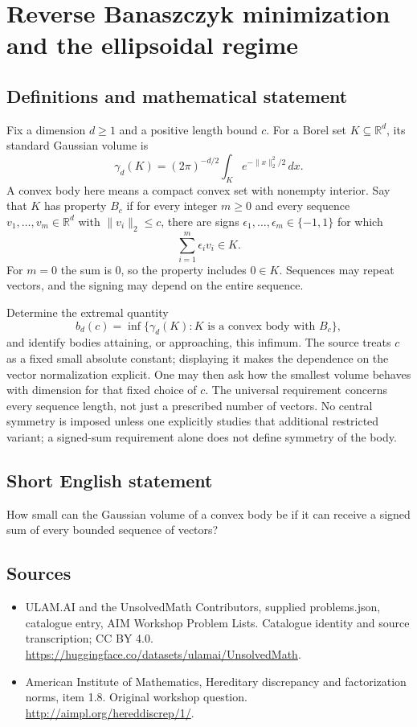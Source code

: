 \documentclass[11pt,a4paper]{article}
\begin{document}
\section*{Reverse Banaszczyk minimization and the ellipsoidal regime}\label{statement}

\subsection{Definitions and mathematical statement}
Fix a dimension $d\geq1$ and a positive length bound $c$.
For a Borel set $K\subseteq\mathbb R^d$, its standard Gaussian volume is
\[
 \gamma_d(K)=(2\pi)^{-d/2}\int_K e^{-\|x\|_2^2/2}\,dx.
\]
A convex body here means a compact convex set with nonempty interior.
Say that $K$ has property $B_c$ if for every integer $m\geq0$ and every sequence $v_1,\ldots,v_m\in\mathbb R^d$ with $\|v_i\|_2\leq c$, there are signs $\epsilon_1,\ldots,\epsilon_m\in\{-1,1\}$ for which
\[
 \sum_{i=1}^m\epsilon_i v_i\in K.
\]
For $m=0$ the sum is $0$, so the property includes $0\in K$.
Sequences may repeat vectors, and the signing may depend on the entire sequence.

Determine the extremal quantity
\[
 b_d(c)=\inf\{\gamma_d(K):K\text{ is a convex body with }B_c\},
\]
and identify bodies attaining, or approaching, this infimum.
The source treats $c$ as a fixed small absolute constant; displaying it makes the dependence on the vector normalization explicit.
One may then ask how the smallest volume behaves with dimension for that fixed choice of $c$.
The universal requirement concerns every sequence length, not just a prescribed number of vectors.
No central symmetry is imposed unless one explicitly studies that additional restricted variant; a signed-sum requirement alone does not define symmetry of the body.
\subsection{Short English statement}
How small can the Gaussian volume of a convex body be if it can receive a signed sum of every bounded sequence of vectors?
\subsection{Sources}
\begin{itemize}
\item[S1] ULAM.AI and the UnsolvedMath Contributors, supplied problems.json, catalogue entry, AIM Workshop Problem Lists. Catalogue identity and source transcription; CC BY 4.0.
\url{https://huggingface.co/datasets/ulamai/UnsolvedMath}.
\item[S2] American Institute of Mathematics, Hereditary discrepancy and factorization norms, item 1.8. Original workshop question.
\url{http://aimpl.org/hereddiscrep/1/}.
\end{itemize}
\end{document}
